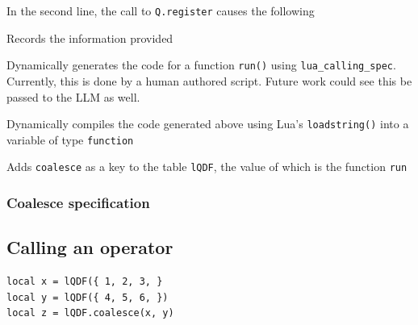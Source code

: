 \documentclass[letterpaper,12pt]{article}
\begin{document}
In the second line, the call to {\tt Q.register} causes the following
\be
\item Records the information provided
\item Dynamically generates the code for a function {\tt run()}
  using \verb+lua_calling_spec+.
  Currently, this is done by a human authored script. 
  Future work could see this be passed to the LLM as well. 
\item Dynamically compiles the code generated above using 
  Lua's {\tt loadstring()} into a variable of type {\tt function}
\item Adds {\tt coalesce} as a key to the table {\tt lQDF}, 
  the value of which is the function {\tt run}
  \ee

\subsubsection{Coalesce specification}
\label{coalesce_spec}


  \subsection{Calling an operator}
  \begin{verbatim}
local x = lQDF({ 1, 2, 3, }
local y = lQDF({ 4, 5, 6, })
local z = lQDF.coalesce(x, y)
  \end{verbatim}
\end{document}
